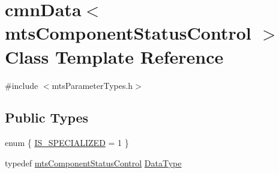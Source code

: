 \hypertarget{classcmn_data_3_01mts_component_status_control_01_4}{}\section{cmn\+Data$<$ mts\+Component\+Status\+Control $>$ Class Template Reference}
\label{classcmn_data_3_01mts_component_status_control_01_4}


{\ttfamily \#include $<$mts\+Parameter\+Types.\+h$>$}

\subsection*{Public Types}
\begin{DoxyCompactItemize}
\item 
enum \{ \hyperlink{classcmn_data_3_01mts_component_status_control_01_4_a6901f36e79e2abe29fe997227e622e42a4bf4eb2c447583de4deb8e2e2da7ab6c}{I\+S\+\_\+\+S\+P\+E\+C\+I\+A\+L\+I\+Z\+E\+D} = 1
 \}
\item 
typedef \hyperlink{classmts_component_status_control}{mts\+Component\+Status\+Control} \hyperlink{classcmn_data_3_01mts_component_status_control_01_4_a568a9683fdee2127ddf90cb856733c3c}{Data\+Type}
\end{DoxyCompactItemize}
